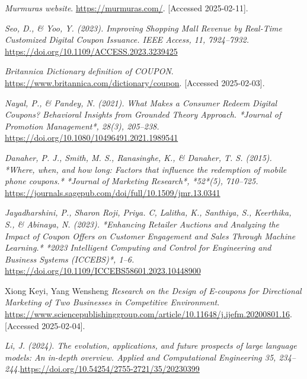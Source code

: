 \documentclass[licencjacka,en]{pracamgr}
\begin{document}
\begin{thebibliography}{99}

    \raggedright
    
    \textit{Murmuras website}.  
    \url{https://murmuras.com/}.  
    [Accessed 2025-02-11].
    
    \textit{Seo, D., \& Yoo, Y. (2023). Improving Shopping Mall Revenue by Real-Time Customized Digital Coupon Issuance. IEEE Access, 11, 7924–7932.}
    \url{https://doi.org/10.1109/ACCESS.2023.3239425}
    
    \textit{Britannica Dictionary definition of COUPON}.
    \url{https://www.britannica.com/dictionary/coupon}.
    [Accessed 2025-02-03].
    
    \textit{Nayal, P., \& Pandey, N. (2021). What Makes a Consumer Redeem Digital Coupons? Behavioral Insights from Grounded Theory Approach. *Journal of Promotion Management*, 28(3), 205–238.}
    \url{https://doi.org/10.1080/10496491.2021.1989541}
    
    \textit{Danaher, P. J., Smith, M. S., Ranasinghe, K., \& Danaher, T. S. (2015). *Where, when, and how long: Factors that influence the redemption of mobile phone coupons.* *Journal of Marketing Research*, *52*(5), 710--725.}
    \url{https://journals.sagepub.com/doi/full/10.1509/jmr.13.0341}
    
    \textit{Jayadharshini, P., Sharon Roji, Priya. C, Lalitha, K., Santhiya, S., Keerthika, S., \& Abinaya, N. (2023). *Enhancing Retailer Auctions and Analyzing the Impact of Coupon Offers on Customer Engagement and Sales Through Machine Learning.* *2023 Intelligent Computing and Control for Engineering and Business Systems (ICCEBS)*, 1–6. }
    \url{https://doi.org/10.1109/ICCEBS58601.2023.10448900}
    
    Xiong Keyi, Yang Wensheng
    \textit{Research on the Design of E-coupons for Directional Marketing of Two Businesses in Competitive Environment}.
    \url{https://www.sciencepublishinggroup.com/article/10.11648/j.ijefm.20200801.16}.
    [Accessed 2025-02-04].
    
    \textit{Li, J. (2024). The evolution, applications, and future prospects of large language models: An in-depth overview. Applied and Computational Engineering 35, 234–244.}\url{https://doi.org/10.54254/2755-2721/35/20230399}
    

\end{thebibliography}
\end{document}
